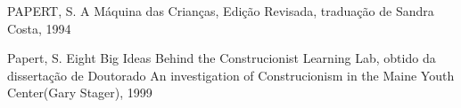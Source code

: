 \documentclass[
12pt,		%
openright,	%
twoside,  %
a4paper,			%
chapter=TITLE,		%
english,			%
french,				%
spanish,			%
brazil				%
]{USPSC-classe/USPSC}
\begin{document}
\begin{flushleft}
\begin{flushleft}
\begin{flushleft}
\begin{flushleft}
\begin{flushleft}
\begin{flushleft}
\begin{flushleft}
\begin{flushleft}
[PAPERT, 1994] PAPERT, S. A M\'aquina das Crian\c{c}as, Edi\c{c}\~ao Revisada, tradua\c{c}\~ao de Sandra Costa, 1994
\end{flushleft}


\end{flushleft}


\end{flushleft}


\end{flushleft}


\end{flushleft}


\end{flushleft}


\end{flushleft}


\end{flushleft}


\begin{flushleft}
\begin{flushleft}
\begin{flushleft}
\begin{flushleft}
\begin{flushleft}
\begin{flushleft}
\begin{flushleft}
\begin{flushleft}
[PAPERT, 1999] Papert, S. Eight Big Ideas Behind the Construcionist Learning Lab, obtido da disserta\c{c}\~ao de Doutorado \textquotedbl An investigation of Construcionism in the Maine Youth Center\textquotedbl  (Gary Stager), 1999
\end{flushleft}


\end{flushleft}


\end{flushleft}


\end{flushleft}


\end{flushleft}


\end{flushleft}


\end{flushleft}


\end{flushleft}
\end{document}
